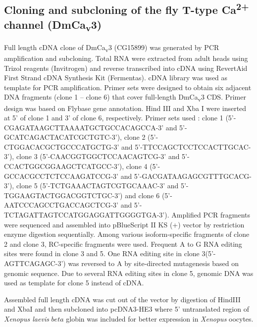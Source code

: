 \subsection*{Cloning and subcloning of the fly T-type Ca\textsuperscript{2+} channel (DmCa\textsubscript{v}3)}

Full length cDNA clone of DmCa\textsubscript{v}3 (CG15899) was generated by PCR amplification and subcloning.
Total RNA were extracted from adult heads using Trizol reagents (Invitrogen) and reverse transcribed into cDNA using RevertAid First Strand cDNA Synthesis Kit (Fermentas).
cDNA library was used as template for PCR amplification.
Primer sets were designed to obtain six adjacent DNA fragments (clone 1 -- clone 6) that cover full-length DmCa\textsubscript{v}3 CDS.
Primer design was based on Flybase gene annotation.
Hind III and Xba I were inserted at 5' of clone 1 and 3' of clone 6, respectively.
Primer sets used : clone 1 (5'-CGAGATAAGCTTAAAATGCTGCCACAGCCA-3' and 5'-GCATCAGACTACATCGCTGTC-3'), clone 2 (5'-CTGGACACGCTGCCCATGCTG-3' and 5'-TTCCAGCTCCTCCACTTGCAC-3'), clone 3 (5'-CAACGGTGGCTCCAACAGTCG-3' and 5'-CCACTGGCGGAAGCTCATGCC-3'), clone 4 (5'-GCCACGCCTCTCCAAGATCCG-3' and 5'-GACGATAAGAGCGTTTGCACG-3'), clone 5 (5'-TCTGAAACTAGTCGTGCAAAC-3' and 5'-TGGAAGTACTGGACGGTCTGC-3') and clone 6 (5'-AATCCCAGCCTGACCAGCTCG-3' and 5'-TCTAGATTAGTCCATGGAGGATTGGGGTGA-3').
Amplified PCR fragments were sequenced and assembled into pBlueScript II KS (+) vector by restriction enzyme digestion sequentially.
Among various isoform-specific fragments of clone 2 and clone 3, RC-specific fragments were used.
Frequent A to G RNA editing sites were found in clone 3 and 5.
One RNA editing site in clone 3(5'-AGTTCAGAGC-3') was reversed to A by site-directed mutagenesis based on genomic sequence.
Due to several RNA editing sites in clone 5, genomic DNA was used as template for clone 5 instead of cDNA.

Assembled full length cDNA was cut out of the vector by digestion of HindIII and XbaI and then subcloned into pcDNA3-HE3 where 5' untranslated region of \emph{Xenopus laevis} $beta$ globin was included for better expression in \emph{Xenopus} oocytes.
